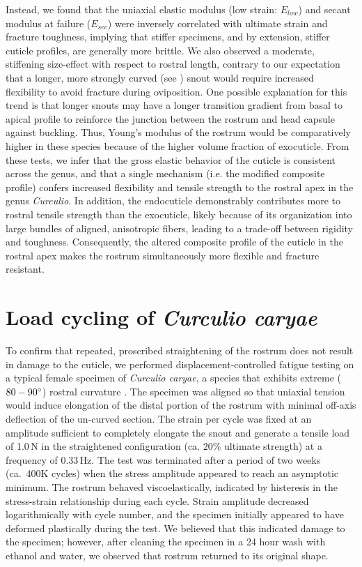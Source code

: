 \documentclass[twocolumn, linenumbers, superscriptaddress, nofootinbib]{revtex4-1}
\begin{document}
		Instead, we found that the uniaxial elastic modulus (low strain: $E_{low}$) and secant modulus at failure ($E_{sec}$) were inversely correlated with ultimate strain and fracture toughness, implying that stiffer specimens, and by extension, stiffer cuticle profiles, are generally more brittle.
		We also observed a moderate, stiffening size-effect with respect to rostral length, contrary to our expectation that a longer, more strongly curved (see \cite{Hughes2004eco, Bonal2011}) snout would require increased flexibility to avoid fracture during oviposition.
		One possible explanation for this trend is that longer snouts may have a longer transition gradient from basal to apical profile to reinforce the junction between the rostrum and head capsule against buckling.
		Thus, Young's modulus of the rostrum would be comparatively higher in these species because of the higher volume fraction of exocuticle.
		From these tests, we infer that the gross elastic behavior of the cuticle is consistent across the genus, and that a single mechanism (i.e. the modified composite profile) confers increased flexibility and tensile strength to the rostral apex in the genus \textit{Curculio}.
		In addition, the endocuticle demonstrably contributes more to rostral tensile strength than the exocuticle, likely because of its organization into large bundles of aligned, anisotropic fibers, leading to a trade-off between rigidity and toughness.
		Consequently, the altered composite profile of the cuticle in the rostral apex makes the rostrum simultaneously more flexible and fracture resistant.
	
	\section{Load cycling of \textit{Curculio caryae}}
		To confirm that repeated, proscribed straightening of the rostrum does not result in damage to the cuticle, we performed displacement-controlled fatigue testing on a typical female specimen of \textit{Curculio caryae}, a species that exhibits extreme ($80-90\degree$) rostral curvature \cite{AguirreUribe1978, Gibson1969}.
		The specimen was aligned so that uniaxial tension would induce elongation of the distal portion of the rostrum with minimal off-axis deflection of the un-curved section.
		The strain per cycle was fixed at an amplitude sufficient to completely elongate the snout and generate a tensile load of 1.0\,N  in the straightened configuration (ca. 20\% ultimate strength) at a frequency of $0.33\,\text{Hz}$.
		The test was terminated after a period of two weeks (ca.~400K cycles) when the stress amplitude appeared to reach an asymptotic minimum.		
		The rostrum behaved viscoelastically, indicated by histeresis in the stress-strain relationship during each cycle.
		Strain amplitude decreased logarithmically with cycle number, and the specimen initially appeared to have deformed plastically during the test.
		We believed that this indicated damage to the specimen; however, after cleaning the specimen in a 24 hour wash with ethanol and water, we observed that rostrum returned to its original shape.
		
\end{document}

